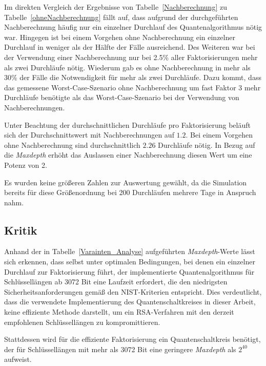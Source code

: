 Im direkten Vergleich der Ergebnisse von Tabelle~\ref{Nachberechnung} zu Tabelle~\ref{ohneNachberechnung} fällt auf, 
dass aufgrund der durchgeführten Nachberechnung häufig nur ein einzelner Durchlauf des Quantenalgorithmus nötig war. 
Hingegen ist bei einem Vorgehen ohne Nachberechnung ein einzelner Durchlauf in weniger als der Hälfte der Fälle ausreichend. 
Des Weiteren war bei der Verwendung einer Nachberechnung nur bei 2.5\% aller Faktorisierungen mehr als zwei Durchläufe nötig. 
Wiederum gab es ohne Nachberechnung in mehr als 30\% der Fälle die Notwendigkeit für mehr als zwei Durchläufe. 
Dazu kommt, 
dass das gemessene Worst-Case-Szenario ohne Nachberechnung um fast Faktor 3 mehr Durchläufe benötigte als das Worst-Case-Szenario bei der Verwendung von Nachberechnungen.

Unter Beachtung der durchschnittlichen Durchläufe pro Faktorisierung beläuft sich der Durchschnittswert mit Nachberechnungen auf \(1.2\). 
Bei einem Vorgehen ohne Nachberechnung sind durchschnittlich \(2.26\) Durchläufe nötig. 
In Bezug auf die \textit{Maxdepth} erhöht das Auslassen einer Nachberechnung diesen Wert um eine Potenz von 2.

Es wurden keine größeren Zahlen zur Auswertung gewählt, 
da die Simulation bereits für diese Größenordnung bei 200 Durchläufen mehrere Tage in Anspruch nahm.

\subsection*{Kritik}

Anhand der in Tabelle~\ref{Varainten_Analyse} aufgeführten \textit{Maxdepth}-Werte lässt sich erkennen, 
dass selbst unter optimalen Bedingungen, bei denen ein einzelner Durchlauf zur Faktorisierung führt, 
der implementierte Quantenalgorithmus für Schlüssellängen ab 3072 Bit eine Laufzeit erfordert, 
die den niedrigsten Sicherheitsanforderungen gemäß den NIST-Kriterien entspricht. 
Dies verdeutlicht, dass die verwendete Implementierung des Quantenschaltkreises in dieser Arbeit, 
keine effiziente Methode darstellt, 
um ein RSA-Verfahren mit den derzeit empfohlenen Schlüssellängen zu kompromittieren.

Stattdessen wird für die effiziente Faktorisierung ein Quantenschaltkreis benötigt, 
der für Schlüssellängen mit mehr als 3072 Bit eine geringere \textit{Maxdepth} als \(2^{40}\) aufweist.

\bigskip

